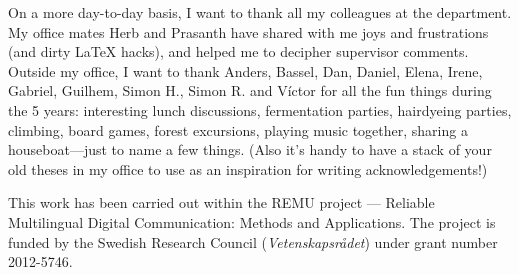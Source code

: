 On a more day-to-day basis, I want to thank all my colleagues at the
department. My office mates Herb and Prasanth have shared with me joys
and frustrations (and dirty \LaTeX{} hacks), and helped me to decipher
supervisor comments. Outside my office, I want to thank Anders,
Bassel, Dan, Daniel, Elena, Irene, Gabriel, Guilhem, Simon H., Simon
R. and Víctor for all the fun things during the 5 years: interesting
lunch discussions, fermentation parties, hairdyeing parties, climbing,
board games, forest excursions, playing music together, sharing a
houseboat---just to name a few things. (Also it's handy to have a
stack of your old theses in my office to use as an inspiration for
writing acknowledgements!)





\vfill\noindent
This work has been carried out within the REMU project — Reliable Multilingual Digital Communication: Methods and Applications.
The project is funded by the Swedish Research Council (\emph{Vetenskapsrådet}) under grant number 2012-5746.
